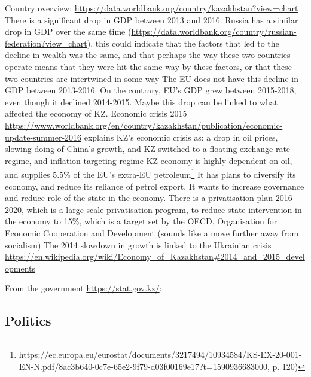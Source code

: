 \documentclass{article}
\begin{document}
\begin{outline}
	\1 Country overview: \url{https://data.worldbank.org/country/kazakhstan?view=chart}
		\2 There is a significant drop in GDP between 2013 and 2016. Russia has a similar drop in GDP over the same time (\url{https://data.worldbank.org/country/russian-federation?view=chart}), this could indicate that the factors that led to the decline in wealth was the same, and that perhaps the way these two countries operate means that they were hit the same way by these factors, or that these two countries are intertwined in some way
		\2 The EU does not have this decline in GDP between 2013-2016. On the contrary, EU's GDP grew between 2015-2018, even though it declined 2014-2015. Maybe this drop can be linked to what affected the economy of KZ.
	\1 Economic crisis 2015
		\2 \url{https://www.worldbank.org/en/country/kazakhstan/publication/economic-update-summer-2016} explains KZ's economic crisis as: a drop in oil prices, slowing doing of China's growth, and 
		\2 KZ switched to a floating exchange-rate regime, and inflation targeting regime 
		\2 KZ economy is highly dependent on oil, and supplies 5.5\% of the EU's extra-EU petroleum\footnote{https://ec.europa.eu/eurostat/documents/3217494/10934584/KS-EX-20-001-EN-N.pdf/8ac3b640-0c7e-65e2-9f79-d03f00169e17?t=1590936683000, p. 120)}
		\2 It has plans to diversify its economy, and reduce its reliance of petrol export. It wants to increase governance and reduce role of the state in the economy. There is a privatisation plan 2016-2020, which is a large-scale privatisation program, to reduce state intervention in the economy to 15\%, which is a target set by the OECD, Organisation for Economic Cooperation and Development (sounds like a move further away from socialism)
		\2 The 2014 slowdown in growth is linked to the Ukrainian crisis \url{https://en.wikipedia.org/wiki/Economy_of_Kazakhstan#2014_and_2015_developments}
\end{outline}

From the government \url{https://stat.gov.kz/}: 

\begin{outline}

\end{outline}

\subsection{Politics}
\end{document}
